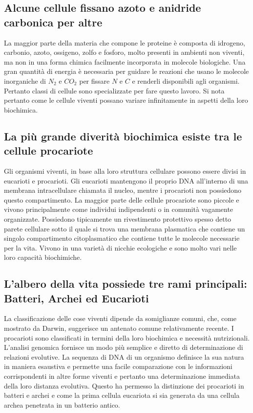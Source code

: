 \subsection{Alcune cellule fissano azoto e anidride carbonica per altre}
La maggior parte della materia che compone le proteine \`e composta di idrogeno, carbonio, azoto, ossigeno, zolfo e fosforo, molto presenti in ambienti non viventi, ma non in una forma
chimica facilmente incorporata in molecole biologiche. Una gran quantit\`a di energia \`e necessaria per guidare le reazioni che usano le molecole inorganiche di $N_2$ e $CO_2$ per 
fissare $N$ e $C$ e renderli disponibili agli organismi. Pertanto classi di cellule sono specializzate per fare questo lavoro. Si nota pertanto come le cellule viventi possano variare 
infinitamente in aspetti della loro biochimica. 
\subsection{La pi\`u grande diverit\`a biochimica esiste tra le cellule procariote}
Gli organismi viventi, in base alla loro struttura cellulare possono essere divisi in eucarioti e procarioti. Gli eucarioti mantengono il proprio DNA all'interno di una membrana 
intracellulare chiamata il nucleo, mentre i procarioti non possiedono questo compartimento. La maggior parte delle cellule procariote sono piccole e vivono principalmente come individui
indipendenti o in comunit\`a vagamente organizzate. Possiedono tipicamente un rivestimento protettivo spesso detto parete cellulare sotto il quale si trova una membrana plasmatica
che contiene un singolo compartimento citoplasmatico che contiene tutte le molecole necessarie per la vita. Vivono in una variet\`a di nicchie ecologiche e sono molto vari nelle loro
capacit\`a biochimiche. 
\subsection{L'albero della vita possiede tre rami principali: Batteri, Archei ed Eucarioti}
La classificazione delle cose viventi dipende da somiglianze comuni, che, come mostrato da Darwin, suggerisce un antenato comune relativamente recente. I procarioti sono classificati in
termini della loro biochimica e necessit\`a nutrizionali. L'analisi genomica fornisce un modo pi\`u semplice e diretto di determinazione di relazioni evolutive. La sequenza di DNA di 
un organismo definisce la sua natura in maniera esaustiva e permette una facile comparazione con le informazioni corrispondenti in altre forme viventi e pertanto una determinazione 
immediata della loro distanza evolutiva. Questo ha permesso la distinzione dei procarioti in batteri e archei e come la prima cellula eucariota si sia generata da una cellula archea 
penetrata in un batterio antico. 

